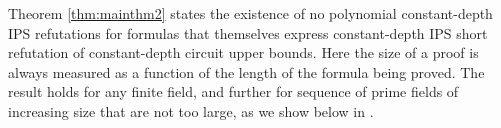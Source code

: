 \documentclass[11pt,letter]{article}
\newtheorem{theorem}{Theorem}[section]
\theoremstyle{remark} %
\newcommand{\perm}{{\rm perm}}
\newcommand{\jiaqi}{\Jiaqi}
\newcommand{\Jiaqi}[1]%
{%
    [%
        {   
                {%
            \textcolor{green}%
                    {\footnotesize{Jiaqi: #1}}%
                }%
        }%
    ]%
}
\begin{document}

Theorem \ref{thm:mainthm2} states the existence of no polynomial constant-depth IPS refutations for formulas that themselves express constant-depth IPS short refutation of constant-depth circuit upper bounds.
%
Here the size of a proof is always measured as a function of the length of the formula being proved. The result holds for any finite field, and further for sequence of prime fields of increasing size that are not too large, as we show below in .


%
\end{document}
